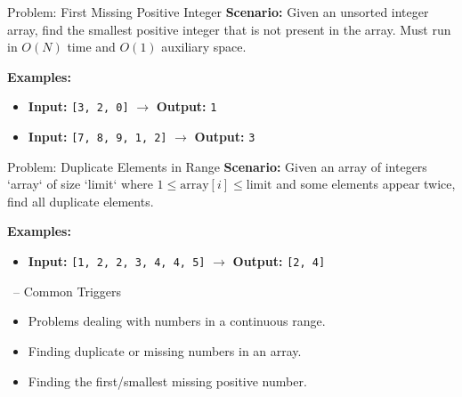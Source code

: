 \begin{frame}[fragile]{Problem: First Missing Positive Integer}
  \textbf{Scenario:}
  Given an unsorted integer array, find the smallest positive integer that is not present in the array. Must run in $O(N)$ time and $O(1)$ auxiliary space.
  
  \vspace{0.3cm}
  \textbf{Examples:}
  \begin{itemize}
    \item \textbf{Input:} \texttt{[3, 2, 0]} $\rightarrow$ \textbf{Output:} \texttt{1}
    \item \textbf{Input:} \texttt{[7, 8, 9, 1, 2]} $\rightarrow$ \textbf{Output:} \texttt{3}
  \end{itemize}
\end{frame}

\begin{frame}[fragile]{Problem: Duplicate Elements in Range}
  \textbf{Scenario:}
  Given an array of integers `array` of size `limit` where $1 \le \text{array}[i] \le \text{limit}$ and some elements appear twice, find all duplicate elements.
  
  \vspace{0.3cm}
  \textbf{Examples:}
  \begin{itemize}
    \item \textbf{Input:} \texttt{[1, 2, 2, 3, 4, 4, 5]} $\rightarrow$ \textbf{Output:} \texttt{[2, 4]}
  \end{itemize}
\end{frame}

\begin{frame}{\secname\ -- Common Triggers}
  \begin{itemize}
    \item Problems dealing with numbers in a continuous range.
        \item Finding duplicate or missing numbers in an array.
        \item Finding the first/smallest missing positive number.
  \end{itemize}
\end{frame}
